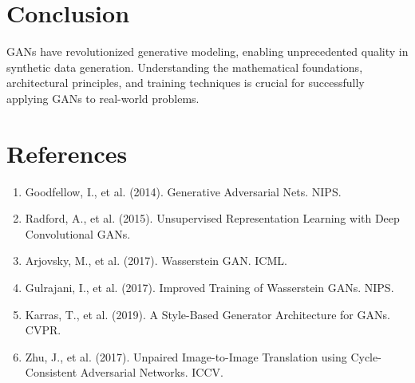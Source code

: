 \documentclass[12pt,a4paper]{article}
\begin{document}
\section{Conclusion}

GANs have revolutionized generative modeling, enabling unprecedented quality in synthetic data generation. Understanding the mathematical foundations, architectural principles, and training techniques is crucial for successfully applying GANs to real-world problems.

\section{References}

\begin{enumerate}
    \item Goodfellow, I., et al. (2014). Generative Adversarial Nets. NIPS.
    \item Radford, A., et al. (2015). Unsupervised Representation Learning with Deep Convolutional GANs.
    \item Arjovsky, M., et al. (2017). Wasserstein GAN. ICML.
    \item Gulrajani, I., et al. (2017). Improved Training of Wasserstein GANs. NIPS.
    \item Karras, T., et al. (2019). A Style-Based Generator Architecture for GANs. CVPR.
    \item Zhu, J., et al. (2017). Unpaired Image-to-Image Translation using Cycle-Consistent Adversarial Networks. ICCV.
\end{enumerate}
\end{document}
